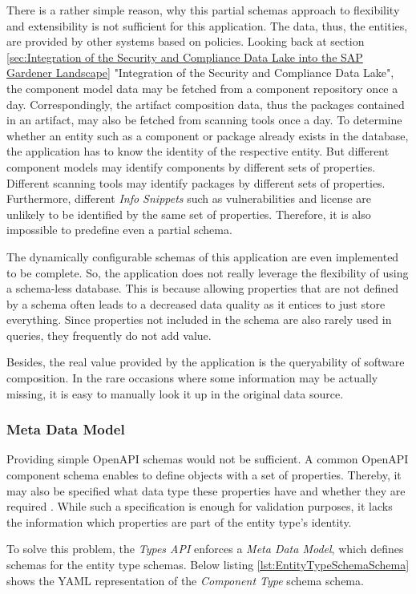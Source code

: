 There is a rather simple reason, why this partial schemas approach to flexibility and extensibility is not sufficient for this application. The data, thus, the entities, are provided by other systems based on policies. Looking back at section \ref{sec:Integration of the Security and Compliance Data Lake into the SAP Gardener Landscape} "Integration of the Security and Compliance Data Lake", the component model data may be fetched from a component repository once a day. Correspondingly, the artifact composition data, thus the packages contained in an artifact, may also be fetched from scanning tools once a day. To determine whether an entity such as a component or package already exists in the database, the application has to know the identity of the respective entity. But different component models may identify components by different sets of properties. Different scanning tools may identify packages by different sets of properties. Furthermore, different \emph{Info Snippets} such as vulnerabilities and license are unlikely to be identified by the same set of properties. Therefore, it is also impossible to predefine even a partial schema.\par 
The dynamically configurable schemas of this application are even implemented to be complete. So, the application does not really leverage the flexibility of using a schema-less database. This is because allowing properties that are not defined by a schema often leads to a decreased data quality as it entices to just store everything. Since properties not included in the schema are also rarely used in queries, they frequently do not add value.\par 
Besides, the real value provided by the application is the queryability of software composition. In the rare occasions where some information may be actually missing, it is easy to manually look it up in the original data source.  


\subsubsection{Meta Data Model} \label{sec:Meta Data Model}
Providing simple OpenAPI schemas would not be sufficient. A common OpenAPI component schema enables to define objects with a set of properties. Thereby, it may also be specified what data type these properties have and whether they are required \cite{OpenAPISpec}. While such a specification is enough for validation purposes, it lacks the information which properties are part of the entity type's identity.\par 
To solve this problem, the \emph{Types API} enforces a \emph{Meta Data Model}, which defines schemas for the entity type schemas. Below listing \ref{lst:EntityTypeSchemaSchema} shows the YAML representation of the \emph{Component Type} schema schema.

